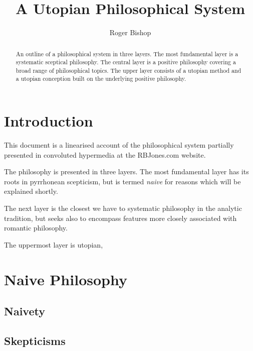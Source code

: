 \documentclass{rbjk}
\begin{document}
                                                                                   
\begin{article}
\begin{opening}  
\title{A Utopian Philosophical System}
\author{Roger Bishop }

\begin{abstract}
An outline of a philosophical system in three layers.
The most fundamental layer is a systematic sceptical philosophy.
The central layer is a positive philosophy covering a broad range of philosophical topics.
The upper layer consists of a utopian method and a utopian conception built on the underlying positive philosophy.
\end{abstract}
\end{opening}

\setcounter{tocdepth}{4}
{\parskip-0pt\tableofcontents}

\section{Introduction}

This document is a linearised account of the philosophical system partially presented in convoluted hypermedia at the RBJones.com website.

The philosophy is presented in three layers.
The most fundamental layer has its roots in pyrrhonean scepticism, but is termed {\it naive} for reasons which will be explained shortly.

The next layer is the closest we have to systematic philosophy in the analytic tradition, but seeks also to encompass features more closely associated with romantic philosophy.

The uppermost layer is utopian,

\section{Naive Philosophy}

\subsection{Naivety}

\subsection{Skepticisms}


\end{article}
\end{document}
